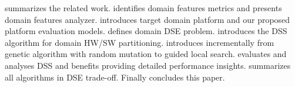 
  summarizes the related work.  identifies domain features metrics and presents domain features analyzer.  introduces target domain platform and our proposed platform evaluation models.  defines domain DSE problem.  introduces the DSS algorithm for domain HW/SW partitioning.  introduces \ga incrementally from genetic algorithm with random mutation to guided local search.   evaluates and analyses DSS and \ga benefits providing detailed performance insights.  summarizes all algorithms in DSE trade-off. Finally  concludes this paper. 